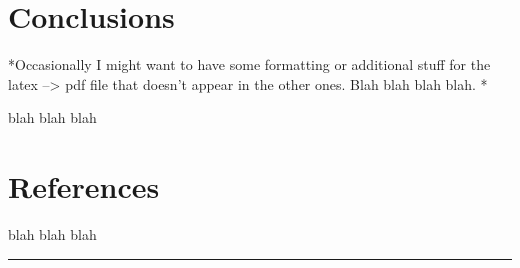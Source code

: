 \documentclass{report}
\begin{document}
    \section{Conclusions}


    *Occasionally I might want to have some formatting or additional stuff
for the latex --\textgreater{} pdf file that doesn't appear in the other
ones. Blah blah blah blah. *

    blah blah blah


    \section{References}


    blah blah blah

    \begin{center}\rule{3in}{0.4pt}\end{center}


    
    
%
%
%
    
    
\end{document}

